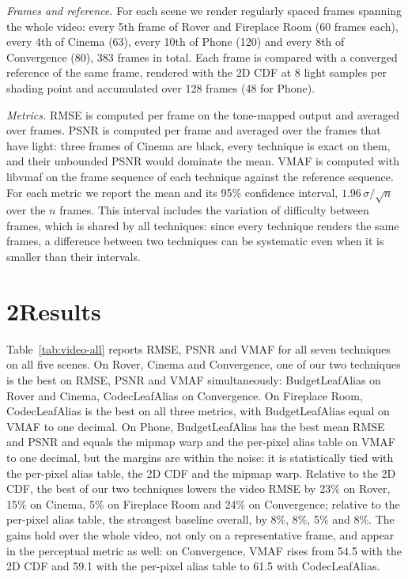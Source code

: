 \documentclass[10pt]{article}
\begin{document}
\emph{Frames and reference.} For each scene we render regularly spaced frames spanning the whole video: every 5th frame of Rover and Fireplace Room (60 frames each), every 4th of Cinema (63), every 10th of Phone (120) and every 8th of Convergence (80), 383 frames in total. Each frame is compared with a converged reference of the same frame, rendered with the 2D CDF at 8 light samples per shading point and accumulated over 128 frames (48 for Phone).

\emph{Metrics.} RMSE is computed per frame on the tone-mapped output and averaged over frames. PSNR is computed per frame and averaged over the frames that have light: three frames of Cinema are black, every technique is exact on them, and their unbounded PSNR would dominate the mean. VMAF is computed with libvmaf on the frame sequence of each technique against the reference sequence. For each metric we report the mean and its 95\% confidence interval, $1.96\,\sigma/\sqrt{n}$ over the $n$ frames. This interval includes the variation of difficulty between frames, which is shared by all techniques: since every technique renders the same frames, a difference between two techniques can be systematic even when it is smaller than their intervals.
\section*{2\quad Results}

Table~\ref{tab:video-all} reports RMSE, PSNR and VMAF for all seven techniques on all five scenes. On Rover, Cinema and Convergence, one of our two techniques is the best on RMSE, PSNR and VMAF simultaneously: BudgetLeafAlias on Rover and Cinema, CodecLeafAlias on Convergence. On Fireplace Room, CodecLeafAlias is the best on all three metrics, with BudgetLeafAlias equal on VMAF to one decimal. On Phone, BudgetLeafAlias has the best mean RMSE and PSNR and equals the mipmap warp and the per-pixel alias table on VMAF to one decimal, but the margins are within the noise: it is statistically tied with the per-pixel alias table, the 2D CDF and the mipmap warp. Relative to the 2D CDF, the best of our two techniques lowers the video RMSE by 23\% on Rover, 15\% on Cinema, 5\% on Fireplace Room and 24\% on Convergence; relative to the per-pixel alias table, the strongest baseline overall, by 8\%, 8\%, 5\% and 8\%. The gains hold over the whole video, not only on a representative frame, and appear in the perceptual metric as well: on Convergence, VMAF rises from 54.5 with the 2D CDF and 59.1 with the per-pixel alias table to 61.5 with CodecLeafAlias.
\end{document}
